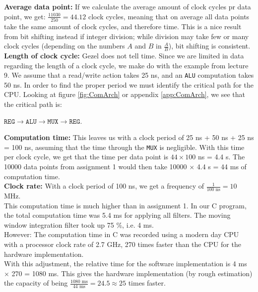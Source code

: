 \textbf{Average data point:} If we calculate the average amount of clock cycles pr data point, we get: $\frac{11030}{250} = 44.12$ clock cycles, meaning that on average all data points take the same amount of clock cycles, and therefore time. This is a nice result from bit shifting instead if integer division; while division may take few or many clock cycles (depending on the numbers $A$ and $B$ in $\frac{A}{B}$), bit shifting is consistent. \\

\textbf{Length of clock cycle:} Gezel does not tell time. Since we are limited in data regarding the length of a clock cycle, we make do with the example from lecture 9. We assume that a read/write action takes 25 ns, and an \texttt{ALU} computation takes 50 ns. In order to find the proper period we must identify the critical path for the CPU. Looking at figure \ref{fig:ComArch} or appendix \ref{app:ComArch}, we see that the critical path is:

\begin{center} 
$\texttt{REG} \rightarrow \texttt{ALU} \rightarrow \texttt{MUX} \rightarrow \texttt{REG}.$
\end{center}

\textbf{Computation time:} This leaves us with a clock period of 25 ns + 50 ns + 25 ns = 100 ns, assuming that the time through the \texttt{MUX} is negligible. With this time per clock cycle, we get that the time per data point is $44 \times 100$ ns = 4.4 \si{\micro}{s}. The 10000 data points from assignment 1 would then take 10000 $\times$ 4.4 \si{\micro}{s} = 44 ms of computation time.\\

\textbf{Clock rate:} With a clock period of 100 ns, we get a frequency of $\frac{1}{100 \text{ ns}} = 10$ MHz. \\

This computation time is much higher than in assignment 1. In our C program, the total computation time was 5.4 ms for applying all filters. The moving window integration filter took up 75 \%, i.e. 4 ms.\\

However: The computation time in C was recorded using a modern day CPU with a processor clock rate of 2.7 GHz, 270 times faster than the CPU for the hardware implementation.\\

With this adjustment, the relative time for the software implementation is 4 ms $\times$ 270 = 1080 ms. This gives the hardware implementation (by rough estimation) the capacity of being $\frac{1080 \text{ ms}}{44 \text{ ms}} = 24.5 \approx 25$ times faster. \\

